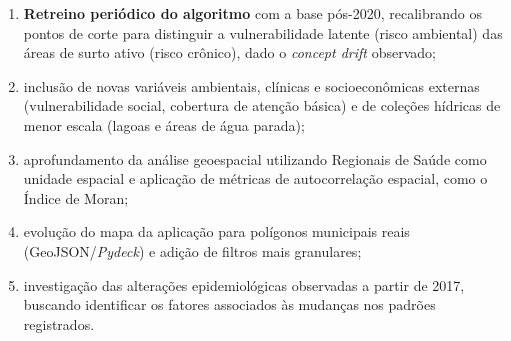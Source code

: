 \documentclass[12pt]{article}
\begin{document}
\begin{enumerate}
    \item \textbf{Retreino periódico do algoritmo} com a base pós-2020, recalibrando os
    pontos de corte para distinguir a vulnerabilidade latente (risco ambiental) das áreas
    de surto ativo (risco crônico), dado o \textit{concept drift} observado;

    \item inclusão de novas variáveis ambientais, clínicas e socioeconômicas externas
    (vulnerabilidade social, cobertura de atenção básica) e de coleções hídricas de menor
    escala (lagoas e áreas de água parada);

    \item aprofundamento da análise geoespacial utilizando Regionais de Saúde como unidade
    espacial e aplicação de métricas de autocorrelação espacial, como o Índice de Moran;

    \item evolução do mapa da aplicação para polígonos municipais reais
    (GeoJSON/\textit{Pydeck}) e adição de filtros mais granulares;

    \item investigação das alterações epidemiológicas observadas a partir de 2017,
    buscando identificar os fatores associados às mudanças nos padrões registrados.
\end{enumerate}
\end{document}
